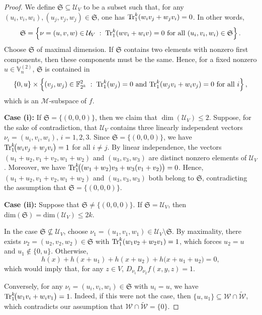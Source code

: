\documentclass[12pt]{article}
\theoremstyle{plain}
\theoremstyle{definition}
\newcommand{\V}{\mathbb{V}}
\newcommand{\Tr}{{\rm Tr}}
\begin{document}
\begin{proof}
		We define $\mathfrak S \subseteq \mathcal U_V$ to be a subset such that, 
		for any $(u_i,v_i,w_i), (u_j,v_j,w_j)\in \mathfrak S$, one has $\Tr_1^k\!\left(w_i v_j + w_j v_i\right)=0$. In other words,
		\[
		\mathfrak{S}
		=
		\left\{
		\nu=(u,v,w)\in \mathcal{U}_V
		\; :\;
		\Tr_1^k\!\left(w v_i + w_i v\right)=0
		\ \text{for all } (u_i,v_i,w_i)\in \mathfrak{S}
		\right\}.\]
		Choose \(\mathfrak{S}\) of maximal dimension.
		If \(\mathfrak{S}\) contains two elements with nonzero first components,
		then these components must be the same.
		Hence, for a fixed nonzero \(u\in \V_n^{(2)} \),
		\(\mathfrak{S}\) is contained in
		\[
		\{0,u\}\times
		\left\{
		(v_j,w_j)\in \mathbb{F}_{2^k}^2
		\; : \;
		\Tr_1^k(w_j)=0
		\ \text{and}\
		\Tr_1^k(w_j v_i + w_i v_j)=0
		\ \text{for all } i
		\right\},
		\]  
		which is an \(\mathcal{M}\)-subspace of \(f\). 
		
		\smallskip
		
		\noindent\textbf{Case (i):}
		If \(\mathfrak{S}=\{(0,0,0)\}\), then
		we claim that \(\dim(\mathcal{U}_V)\leq 2\).
		Suppose, for the sake of contradiction, that \(\mathcal{U}_V\) contains
		three linearly independent vectors
		\(\nu_i=(u_i,v_i,w_i)\), \(i=1,2,3\).
		Since \(\mathfrak{S}=\{(0,0,0)\}\), we have $\Tr_1^k\!\bigl(w_i v_j + w_j v_i\bigr)=1$ for all $i\neq j$.
		By linear independence, the vectors
		\((u_1+u_2,v_1+v_2,w_1+w_2)\) and
		\((u_3,v_3,w_3)\)
		are distinct nonzero elements of \(\mathcal{U}_V\).
		Moreover, we have $\Tr_1^k\!\bigl((w_1+w_2)v_3+w_3(v_1+v_2)\bigr)=0$.
		Hence,
		\((u_1+u_2,v_1+v_2,w_1+w_2)\) and
		\((u_3,v_3,w_3)\)
		both belong to \(\mathfrak{S}\),
		contradicting the assumption that
		\(\mathfrak{S}=\{(0,0,0)\}\).
		
		\smallskip
		\noindent\textbf{Case (ii):}
		Suppose that \(\mathfrak{S}\neq\{(0,0,0)\}\). If
		\(\mathfrak{S} =\mathcal{U}_V\),
		then $\mathrm{dim}(\mathfrak{S}) =  \mathrm{dim}(\mathcal{U}_V)\leq 2k$.
		
		In the case $\mathfrak{S} \not\subseteq \mathcal{U}_V$, choose
		\(\nu_1=(u_1,v_1,w_1)\in \mathcal{U}_V\setminus \mathfrak{S}\).
		By maximality, there exists
		\(\nu_2=(u_2,v_2,w_2)\in \mathfrak{S}\)  with
		\(\Tr_1^k(w_1v_2+w_2v_1)=1\),
		which forces \(u_2=u\) and \(u_1\notin\{0,u\}\).
		Otherwise,
		\[
		h(x)+h(x+u_1)+h(x+u_2)+h\bigl(x+u_1+u_2\bigr)=0,
		\]
		which would imply that, for any \(z\in V\), $D_{\nu_1}D_{\nu_2}f(x,y,z)=1$.
		
		Conversely, for any \(\nu_i=(u_i,v_i,w_i)\in \mathfrak{S}\) with \(u_i=u\),
		we have $\Tr_1^k\!\bigl(w_1v_i+w_iv_1\bigr)=1$.
		Indeed, if this were not the case, then
		\(\{u,u_1\}\subseteq \mathcal{W} \cap \widetilde{\mathcal{W} }\),
		which contradicts our assumption that
		\(\mathcal{W} \cap \widetilde{\mathcal{W} }=\{0\}\).
		

\end{proof}
\end{document}
